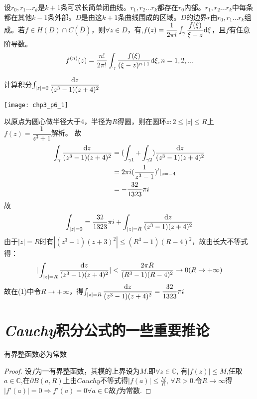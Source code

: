 \begin{theorem}
	设$r_0,r_1...r_k$是$k+1$条可求长简单闭曲线。$r_1,r_2...r_k$都存在$r_0$内部。$r_1,r_2...r_k$中每条都在其他$k-1$条外部。$D$是由这$k+1$条曲线围成的区域。$D$的边界$r$由$r_0,r_1...r_k$组成。若$f\in H(D)\cap C(\bar{D})$，则$\forall z\in D$，有,$f(z)=\dfrac{1}{2\pi i}\int_\gamma\dfrac{f(\xi)}{\xi-z}\mathrm{d}\xi$，且$f$有任意阶导数。
	\[f^{(n)}(z)=\dfrac{n!}{2\pi!}\int_\gamma\dfrac{f(\xi)}{(\xi-z)^{n+1}}\mathrm{d}\xi, n=1,2,...\]
\end{theorem}

\begin{eg}
	计算积分$\int_{|z|=2}\dfrac{\mathrm{d}z}{(z^3-1)(z+4)^2}$
	\begin{center}
		\texttt{[image: chp3\_p6\_1]}
	\end{center}
	
	以原点为圆心做半径大于4，半径为$R$得圆，则在圆环${z:2\leq|z|\leq R}$上$f(z)=\dfrac{1}{z^3+1}$解析。
	故
	\begin{align*}
	\int_\gamma\dfrac{\mathrm{d}z}{(z^3-1)(z+4)^2}&=(\int_{\gamma 1}+\int_{\gamma 2})\dfrac{\mathrm{d}z}{(z^3-1)(z+4)^2}\\
	&=2\pi i(\dfrac{1}{z^3-1})'|_{z=-4}\\
	&=-\dfrac{32}{1323}\pi i
	\end{align*}
	故\begin{equation}
	\int_{|z|=2}=\dfrac{32}{1323}\pi i+\int_{|z|=R}\dfrac{\mathrm{d}z}{(z^3-1)(z+4)^2}
	\end{equation}
	由于$|z|=R$时有$|(z^3-1)(z+3)^2|\leq(R^3-1)(R-4)^2$，故由长大不等式得：
	\[|\int_{|z|=R}\dfrac{\mathrm{d}z}{(z^3-1)(z+4)^2}|<\dfrac{2\pi R}{(R^3-1)(R-4)^2}\to 0(R\to+\infty)\]
	故在(1)中令$R\to+\infty$，得$\int_{|z|=R}\dfrac{\mathrm{d}z}{(z^3-1)(z+4)^2}=\dfrac{32}{1323}\pi i$
	
\end{eg}







\section{\emph{Cauchy}积分公式的一些重要推论}

\begin{theorem}
	有界整函数必为常数
\end{theorem}
\begin{proof}
	设$f$为一有界整函数，其模的上界设为$M$.即$\forall z\in\mathbb{C}$,
	有$|f(z)|\leq M$,任取$a\in\mathbb{C}$,在$\partial$$B(a,R)$上由$Cauchy$不等式得$\displaystyle{|f(a)|\le\frac{M}{R}}$,
	$\forall R>0$.令$R\rightarrow\infty$得$|f'(a)|=0\Rightarrow f'(a)=0\forall a\in\mathbb{C}$故$f$为常数.
\end{proof}

